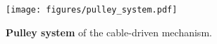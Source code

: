 \begin{figure}[ht]
  \centering
  \texttt{[image: figures/pulley\_system.pdf]}
  \caption{
  \textbf{Pulley system} of the cable-driven mechanism.
  }
  \label{fig:pulley_system}
  \vspace{-3mm}
\end{figure}